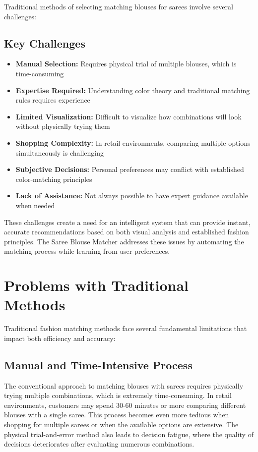 \documentclass[12pt,a4paper]{report}
\begin{document}
Traditional methods of selecting matching blouses for sarees involve several challenges:

\subsection{Key Challenges}

\begin{itemize}
    \item \textbf{Manual Selection:} Requires physical trial of multiple blouses, which is time-consuming
    \item \textbf{Expertise Required:} Understanding color theory and traditional matching rules requires experience
    \item \textbf{Limited Visualization:} Difficult to visualize how combinations will look without physically trying them
    \item \textbf{Shopping Complexity:} In retail environments, comparing multiple options simultaneously is challenging
    \item \textbf{Subjective Decisions:} Personal preferences may conflict with established color-matching principles
    \item \textbf{Lack of Assistance:} Not always possible to have expert guidance available when needed
\end{itemize}

These challenges create a need for an intelligent system that can provide instant, accurate recommendations based on both visual analysis and established fashion principles. The Saree Blouse Matcher addresses these issues by automating the matching process while learning from user preferences.

\section{Problems with Traditional Methods}

Traditional fashion matching methods face several fundamental limitations that impact both efficiency and accuracy:

\subsection{Manual and Time-Intensive Process}

The conventional approach to matching blouses with sarees requires physically trying multiple combinations, which is extremely time-consuming. In retail environments, customers may spend 30-60 minutes or more comparing different blouses with a single saree. This process becomes even more tedious when shopping for multiple sarees or when the available options are extensive. The physical trial-and-error method also leads to decision fatigue, where the quality of decisions deteriorates after evaluating numerous combinations.
\end{document}

